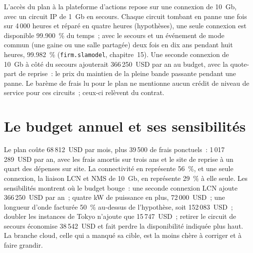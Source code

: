 L'accès du plan à la plateforme d'actions repose sur une connexion de 10~Gb, avec un circuit IP de 1~Gb en secours. Chaque circuit tombant en panne
une fois sur 4\,000 heures et réparé en quatre heures (hypothèses), une seule connexion est disponible 99.900~\% du temps~; avec le secours et un
événement de mode commun (une gaine ou une salle partagée) deux fois en dix ans pendant huit heures, 99.982~\% (\texttt{firm.slamodel}, chapitre~15). Une seconde
connexion de 10~Gb à côté du secours ajouterait 366\,250~USD par an au budget, avec la quote-part de reprise~: le prix du maintien de la pleine bande passante pendant une panne.
Le barème de frais lu pour le plan ne mentionne aucun
crédit de niveau de service pour ces circuits~; ceux-ci relèvent du contrat.

\section{Le budget annuel et ses sensibilités}

\begin{omfigure}

\label{fig:nw:build-a-connectivity-plan:budget}
\end{omfigure}

Le plan coûte 68\,812~USD par mois, plus 39\,500 de frais ponctuels~: 1\,017\,289~USD par an, avec les frais amortis sur trois ans et le
site de reprise à un quart des dépenses sur site. La connectivité en représente 56~\%, et une seule connexion, la liaison LCN et NMS de 10~Gb, en représente 29~\%
à elle seule. Les sensibilités montrent où le budget bouge~: une seconde connexion LCN ajoute 366\,250~USD par an~; quatre kW de puissance en plus, 72\,000~USD~; une
longueur d'onde facturée 50~\% au-dessus de l'hypothèse, soit 152\,083~USD~; doubler les instances de Tokyo n'ajoute que 15\,747~USD~; retirer le circuit de secours économise 38\,542~USD
et fait perdre la disponibilité indiquée plus haut. La branche cloud, celle qui a manqué sa cible, est la moins chère à corriger et à faire grandir.

